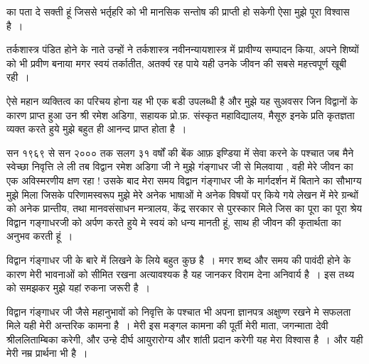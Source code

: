 {का पता दे सक्ती हूं जिससे भर्तृहरि को भी मानसिक सन्तोष की प्राप्ती हो सकेगी ऐसा मुझे पूरा विश्वास है~। 

तर्कशास्त्र पंडित होने के नाते उन्हों ने तर्कशास्त्र नवीनन्यायशास्त्र में प्रावीण्य सम्पादन किया, अपने शिष्यों को भी प्रवीण बनाया मगर स्वयं तर्कातीत, अतर्क्य रह पाये यही उनके जीवन की सबसे महत्त्वपूर्ण खूबी रही~। 

ऐसे महान व्यक्तित्व का परिचय होना यह भी एक बडी उपलब्धी है और मुझे यह सुअवसर जिन विद्वानों के कारण प्राप्त हुआ उन श्री रमेश अडिगा, सहायक प्रो.फ़. संस्कृत महाविद्यालय, मैसूरु इनके प्रति कृतज्ञता व्यक्त करते हुये मुझे बहुत ही आनन्द प्राप्त होता है~। 

सन १९६९ से सन २००० तक सलग ३१ वर्षों की बेंक आफ़ इण्डिया में सेवा करने के पश्चात जब मैने स्वेच्छा निवृत्ति ले ली तब विद्वान रमेश अडिगा जी ने मुझे गंङ्गाधर जी से मिलवाया , वही मेरे जीवन का एक अविस्मरणीय क्षण रहा ! उसके बाद मेरा समय विद्वान गंङ्गाधर जी के मार्गदर्शन में बिताने का सौभाग्य मुझे मिला जिसके परिणामस्वरूप मुझे मेरे अनेक भाषाओं मे अनेक विषयों पर् किये गये लेखन में मेरे ग्रन्थों को अनेक प्रान्तीय, तथा मानवसंसाधन मन्त्रालय, केंद्र सरकार से पुरस्कार मिले जिस का पूरा का पूरा श्रेय विद्वान गङ्गाधरजी को अर्पण करते हुये मे स्वयं को धन्य मानती हूं, साथ ही जीवन की कृतार्थता का   अनुभव करती हूं~।

विद्वान गंङ्गाधर जी के बारे में लिखने के लिये बहुत कुछ है~।  मगर शब्द और समय की पावंदी होने के कारण मेरी भावनाओं को सीमित रखना अत्यावश्यक है यह जानकर विराम देना अनिवार्य है~। इस तथ्य को समझकर मुझे यहां रुकना जरूरी है~। 

विद्वान गंङ्गाधर जी जैसे महानुभावों को निवृत्ति के पश्चात भी अपना ज्ञानपत्र अक्षुण्ण रखने मे सफलता मिले यही मेरी अन्तरिक कामना है~। मेरी इस मङ्गल कामना की पूर्ती मेरी माता, जगन्माता देवी श्रीललिताम्बिका करेगी, और उन्हे दीर्घ आयुरारोग्य और शांती प्रदान करेगी यह मेरा विश्वास है~। और यही मेरी नम्र प्रार्थना भी है~।

\articleend
}
